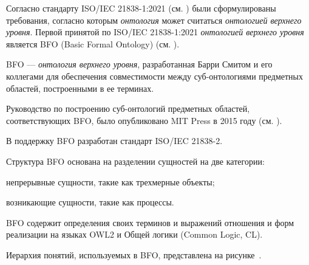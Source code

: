 \begin{SCn}
\end{SCn}

Согласно стандарту ISO/IEC 21838-1:2021 (см. ) были сформулированы требования, согласно которым \textit{онтология} может считаться \textit{онтологией верхнего уровня}. Первой принятой по ISO/IEC 21838-1:2021 \textit{онтологией верхнего уровня} является BFO (Basic Formal Ontology) (см. ).

BFO --- \textit{онтология верхнего уровня}, разработанная Барри Смитом и его коллегами для обеспечения совместимости между суб-онтологиями предметных областей, построенными в ее терминах. 

Руководство по построению суб-онтологий предметных областей, соответствующих BFO, было опубликовано MIT Press в 2015 году (см. ).

В поддержку BFO разработан стандарт ISO/IEC 21838-2.

Структура BFO основана на разделении сущностей на две категории:
\begin{textitemize}
	\item непрерывные сущности, такие как трехмерные объекты;
	\item возникающие сущности, такие как процессы.
\end{textitemize}

BFO содержит определения своих терминов и выражений отношения и форм реализации на языках OWL2 и Общей логики (Common Logic, CL).

Иерархия понятий, используемых в BFO, представлена на рисунке~\textit{}.

